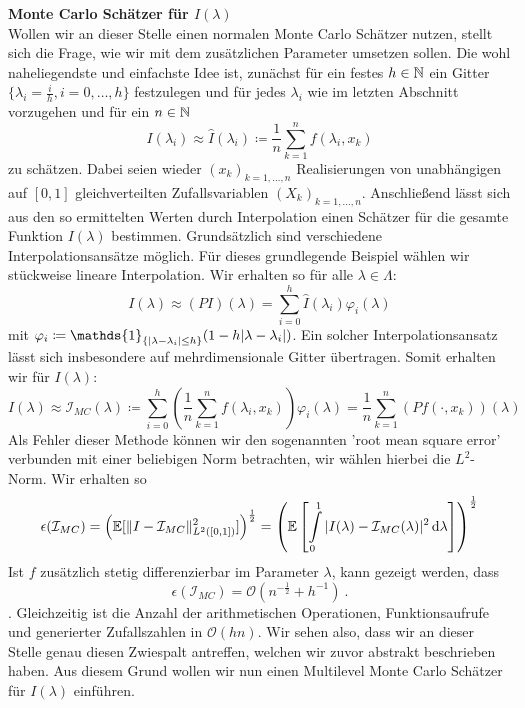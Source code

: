 \begin{Beispiel}
	\textbf{Monte Carlo Schätzer für $I(\lambda)$}\\
	Wollen wir an dieser Stelle einen normalen Monte Carlo Schätzer nutzen, stellt sich die Frage, wie wir mit dem zusätzlichen Parameter umsetzen sollen. Die wohl naheliegendste und einfachste Idee ist, zunächst für ein festes $ h \in \mathbb{N} $ ein Gitter $ \{ \lambda_i = \frac{i}{h}, i=0,\dots,h\} $ festzulegen und für jedes $ \lambda_i $ wie im letzten Abschnitt vorzugehen und für ein $ n \in \mathbb{N} $
	\[
		I(\lambda_i) \approx \hat{I}(\lambda_i) \coloneqq \frac{1}{n} \sum_{k=1}^{n} f(\lambda_i,x_k)
	\]
	zu schätzen. Dabei seien wieder $ (x_k)_{k=1,\dots,n} $ Realisierungen von unabhängigen auf $ [0,1] $ gleichverteilten Zufallsvariablen $ (X_k)_{k=1,\dots,n} $.
	Anschließend lässt sich aus den so ermittelten Werten durch Interpolation einen Schätzer für die gesamte Funktion $ I(\lambda) $ bestimmen. Grundsätzlich sind verschiedene Interpolationsansätze möglich. Für dieses grundlegende Beispiel wählen wir stückweise lineare Interpolation. Wir erhalten so für alle $ \lambda \in \Lambda $:
	\[
		I(\lambda) \approx (PI)(\lambda) = \sum_{i=0}^{h} \hat{I}(\lambda_i) \varphi_i(\lambda)
	\]
	mit $ \varphi_i \coloneqq \mathds{1}_{ \{\abs{\lambda - \lambda_i} \leq h \} }(1-h\abs{\lambda-\lambda_i})$. Ein solcher Interpolationsansatz lässt sich insbesondere auf mehrdimensionale Gitter übertragen.
	Somit erhalten wir für $ I(\lambda) $:
	\[
		I(\lambda) \approx \mathcal{I}_{MC}(\lambda) \coloneqq \sum_{i=0}^{h} \left( \frac{1}{n}\sum_{k=1}^{n} f(\lambda_i, x_k)\right) \varphi_i (\lambda) = \frac{1}{n} \sum_{k=1}^{n} (Pf(\cdot,x_k))(\lambda)
	\]
	Als Fehler dieser Methode können wir den sogenannten 'root mean square error' verbunden mit einer beliebigen Norm betrachten, wir wählen hierbei die $ L^2 $-Norm.
	Wir erhalten so 
	\[ 
	\epsilon(\mathcal{I}_{MC})  = \left( \mathbb{E} [\lVert I -  \mathcal{I}_{MC} \rVert_{L^2([0,1])}^2] \right)^{\frac{1}{2}} = \left( \mathbb{E} \left[ \int\limits_{0}^{1} | I(\lambda) - \mathcal{I}_{MC}(\lambda) |^2 \, \mathrm{d} \lambda \right] \right)^{\frac{1}{2}}
	\]
	Ist $ f $ zusätzlich stetig differenzierbar im Parameter $ \lambda $, kann gezeigt werden, dass 
	\[
		\epsilon(\mathcal{I}_{MC}) = \mathcal{O}(n^{-\frac{1}{2}}+h^{-1}) \ .
	\].
	Gleichzeitig ist die Anzahl der arithmetischen Operationen, Funktionsaufrufe und generierter Zufallszahlen in $ \mathcal{O}(hn) $.
	Wir sehen also, dass wir an dieser Stelle genau diesen Zwiespalt antreffen, welchen wir zuvor abstrakt beschrieben haben. Aus diesem Grund wollen wir nun einen Multilevel Monte Carlo Schätzer für $ I(\lambda) $ einführen.\\	
	

\end{Beispiel}
